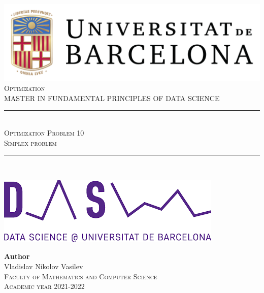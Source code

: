 \documentclass[11pt,a4paper]{article}
\newcommand{\subject}{Optimization}
\newcommand{\autor}{Vladislav Nikolov Vasilev}
\newcommand{\titulo}{Optimization Problem 10}
\newcommand{\subtitulo}{Simplex problem}
\newcommand{\masters}{Master in Fundamental Principles of Data Science}
\begin{document}

\begin{titlepage}
  \begin{minipage}{\textwidth}
    \centering
    \includegraphics[scale=0.25]{img/ub-logo}\\[2cm]
    
    \textsc{\Large \subject\\[0.5cm]}
    \textsc{\uppercase\expandafter{\masters}}\\[1.5cm]
    
    \noindent\rule[-1ex]{\textwidth}{1pt}\\[1.5ex]
    \textsc{{\Huge \titulo\\[0.5ex]}}
    \textsc{{\Large \subtitulo\\}}
    \noindent\rule[-1ex]{\textwidth}{2pt}\\[3.5ex]
  \end{minipage}
  
  \vspace{2cm}
  
  \begin{minipage}{\textwidth}
    \centering
    
    \includegraphics[scale=0.4]{img/ub-ds-logo}
    \vspace{2cm}
    
    \textbf{Author}\\ {\autor{}}\\[2.5ex]
    \textsc{Faculty of Mathematics and Computer Science}\\
    \vspace{1em}
    \textsc{Academic year 2021-2022}
  \end{minipage}
\end{titlepage}
\end{document}
